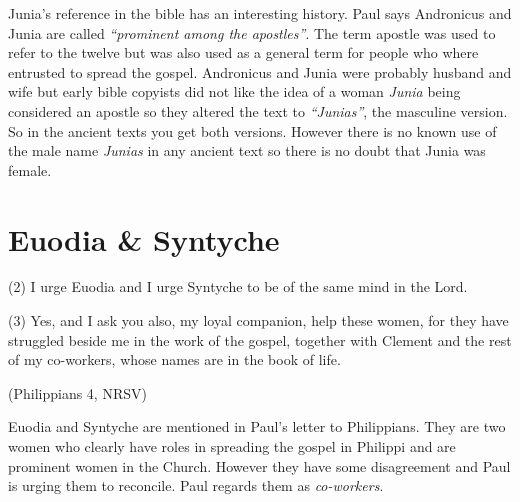 \documentclass[a5paper, openany, oneside, pagesize,
headings=standardclasses, chapterprefix=false]{scrbook}
\begin{document}
Junia's reference in the bible has an interesting history. Paul says
Andronicus and Junia are called \emph{``prominent among the
  apostles''}. The term apostle was used to refer to the twelve but
was also used as a general term for people who where entrusted to
spread the gospel. Andronicus and Junia were probably husband and wife
but early bible copyists did not like the idea of a woman \emph{Junia}
being considered an apostle so they altered the text to
\emph{``Junias''}, the masculine version. So in the ancient texts you
get both versions. However there is no known use of the male name
\emph{Junias} in any ancient text so there is no doubt that Junia was female.

\section{Euodia \& Syntyche}

\begin{myquote}
(2) I urge Euodia and I urge Syntyche to be of the same mind in the
Lord.

(3) Yes, and I ask you also, my loyal companion, help these women, for they have struggled beside me in the work of the gospel, together with Clement and the rest of my co-workers, whose names are in the book of life.

(Philippians 4, NRSV)
\end{myquote}

Euodia and Syntyche are mentioned in Paul's letter to Philippians.
They are two women who clearly have roles in spreading the gospel in
Philippi and are prominent women in the Church. However they have some
disagreement and Paul is urging them to reconcile. Paul regards them
as \emph{co-workers}. 



\backmatter

\nocite{NRSV,NIV,ISV,Lexham2010,ISV1996,Wright2004}

\printbibliography
\end{document}

